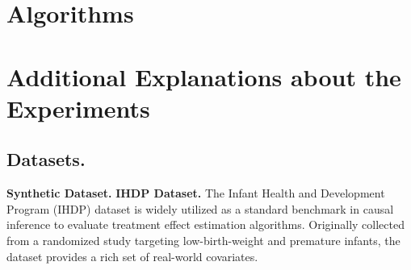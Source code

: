 \documentclass[twoside]{article}
\theoremstyle{plain}
\theoremstyle{definition}
\theoremstyle{remark}
\newtheorem{proof sketch}[theorem]{Proof Sketch}
\begin{document}

\section{Algorithms}

\section{Additional Explanations about the Experiments} 
\subsection{Datasets.}
\textbf{Synthetic Dataset.}
\textbf{IHDP Dataset.} The Infant Health and Development Program (IHDP) dataset is widely utilized as a standard benchmark in causal inference to evaluate treatment effect estimation algorithms. Originally collected from a randomized study targeting low-birth-weight and premature infants, the dataset provides a rich set of real-world covariates. 
\end{document}
